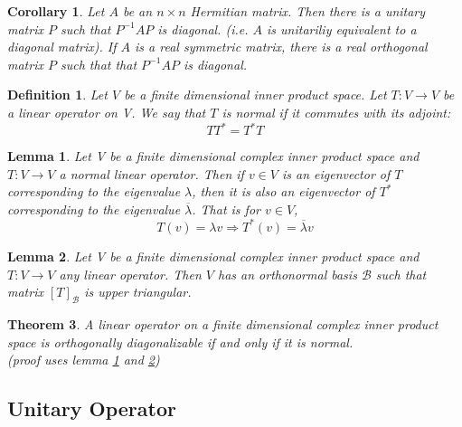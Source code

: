 \documentclass{article}
\newtheorem{theorem}{Theorem}[section]
\newtheorem{definition}{Definition}[section]
\newtheorem{corollary}{Corollary}[theorem]
\newtheorem{lemma}[theorem]{Lemma}
\numberwithin{theorem}{subsection} %
\numberwithin{definition}{subsection} %
\begin{document}
\begin{corollary}
    Let $A$ be an $n \times n$ Hermitian matrix. Then there is a unitary matrix $P$ such
    that $P^{-1}AP$ is diagonal. (i.e. $A$ is unitariliy equivalent to a diagonal matrix).
    If $A$ is a real symmetric matrix, there is a real orthogonal matrix $P$ such that 
    that $P^{-1}AP$ is diagonal.
\end{corollary}

\begin{definition}
    Let $V$ be a finite dimensional inner product space. Let $T:V \rightarrow V$ be
    a linear operator on V. We say that $T$ is normal if it commutes with its adjoint: 
    \begin{equation*}
        TT^* = T^*T
    \end{equation*}
\end{definition}

\begin{lemma}\label{lem2}
    Let V be a finite dimensional complex inner product space and $T:V\rightarrow V$
    a normal linear operator. Then if $v \in V$ is an eigenvector of $T$ corresponding to
    the eigenvalue $\lambda$, then it is also an eigenvector of $T^*$ corresponding to the
    eigenvalue $\overline{\lambda}$. That is for $v \in V$,
    \begin{equation*}
        T(v) = \lambda v \Rightarrow T^*(v) = \overline{\lambda} v
    \end{equation*}
\end{lemma}

\begin{lemma}\label{lem3}
    Let V be a finite dimensional complex inner product space and $T:V\rightarrow V$
    any linear operator. Then $V$ has an orthonormal basis $\mathcal{B}$ such that matrix
    $[T]_\mathcal{B}$ is upper triangular. 
\end{lemma}

\begin{theorem}
    A linear operator on a finite dimensional complex inner product space is orthogonally
    diagonalizable if and only if it is normal. \\
    (proof uses lemma \ref{lem2} and \ref{lem3})
\end{theorem}
        

\subsection{Unitary Operator}
\end{document}

